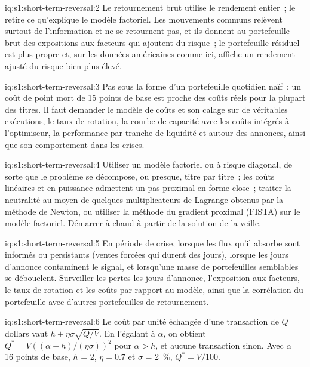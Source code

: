 \begin{solution}{iq:s1:short-term-reversal:2}
Le retournement brut utilise le rendement entier~; le  retire ce qu'explique le modèle factoriel. Les mouvements communs relèvent surtout de l'information et ne se retournent pas, et ils donnent au
portefeuille brut des expositions aux facteurs qui ajoutent du risque~; le portefeuille résiduel est plus propre et, sur les données américaines comme ici, affiche un rendement ajusté du risque bien plus élevé.
\end{solution}

\begin{solution}{iq:s1:short-term-reversal:3}
Pas sous la forme d'un portefeuille quotidien naïf~: un coût de point mort de 15 points de base est proche des coûts réels pour la plupart des titres. Il faut demander le modèle de coûts et son calage sur de véritables exécutions, le taux de rotation,
la courbe de capacité avec les coûts intégrés à l'optimiseur, la performance par tranche de liquidité et autour des annonces, ainsi que son comportement dans les crises.
\end{solution}

\begin{solution}{iq:s1:short-term-reversal:4}
Utiliser un modèle factoriel ou à risque diagonal, de sorte que le problème se décompose, ou presque, titre par titre~; les coûts linéaires et en puissance admettent un pas proximal en forme close~; traiter
la neutralité au moyen de quelques multiplicateurs de Lagrange obtenus par la méthode de Newton, ou utiliser la méthode du gradient proximal (FISTA) sur le modèle factoriel. Démarrer à chaud
à partir de la solution de la veille.
\end{solution}

\begin{solution}{iq:s1:short-term-reversal:5}
En période de crise, lorsque les flux qu'il absorbe sont informés ou persistants (ventes forcées qui durent des jours), lorsque les jours d'annonce contaminent le signal, et lorsqu'une
masse de portefeuilles semblables se débouclent. Surveiller les pertes les jours d'annonce, l'exposition aux facteurs, le taux de rotation et les coûts par rapport au modèle, ainsi que la corrélation du portefeuille avec d'autres
portefeuilles de retournement.
\end{solution}

\begin{solution}{iq:s1:short-term-reversal:6}
Le coût par unité échangée d'une transaction de $Q$ dollars vaut $h + \eta\sigma\sqrt{Q/V}$. En l'égalant à $\alpha$, on obtient $Q^* = V\left((\alpha - h)/(\eta\sigma)\right)^2$
pour $\alpha > h$, et aucune transaction sinon. Avec $\alpha$ = 16 points de base, $h$ = 2, $\eta = 0.7$ et $\sigma$ = 2~\%, $Q^* = V/100$.
\end{solution}
